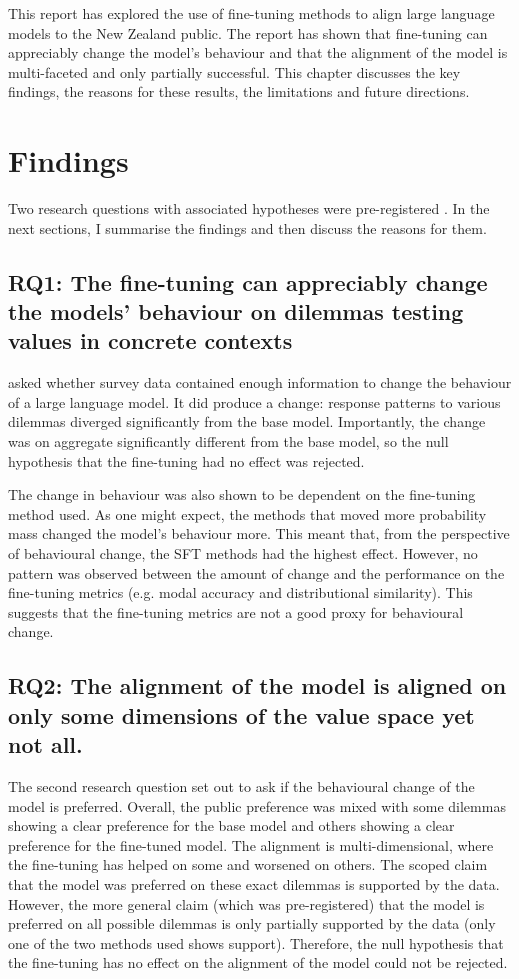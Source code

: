 This report has explored the use of fine-tuning methods to align large language models to the New Zealand public. The report has shown that fine-tuning can appreciably change the model's behaviour and that the alignment of the model is multi-faceted and only partially successful. This chapter discusses the key findings, the reasons for these results, the limitations and future directions.

\section{Findings}

Two research questions with associated hypotheses were pre-registered \cite{thompsonPreregistrationAligningLLMs2026/10/1515:17}. In the next sections, I summarise the findings and then discuss the reasons for them.

\subsection{RQ1: The fine-tuning can appreciably change the models' behaviour on dilemmas testing values in concrete contexts}

 asked whether survey data contained enough information to change the behaviour of a large language model. It did produce a change: response patterns to various dilemmas diverged significantly from the base model. Importantly, the change was on aggregate significantly different from the base model, so the null hypothesis that the fine-tuning had no effect was rejected.

The change in behaviour was also shown to be dependent on the fine-tuning method used. As one might expect, the methods that moved more probability mass changed the model's behaviour more. This meant that, from the perspective of behavioural change, the SFT methods had the highest effect. However, no pattern was observed between the amount of change and the performance on the fine-tuning metrics (e.g. modal accuracy and distributional similarity). This suggests that the fine-tuning metrics are not a good proxy for behavioural change.

\subsection{RQ2: The alignment of the model is aligned on only some dimensions of the value space yet not all.}

The second research question  set out to ask if the behavioural change of the model is preferred. Overall, the public preference was mixed with some dilemmas showing a clear preference for the base model and others showing a clear preference for the fine-tuned model. The alignment is multi-dimensional, where the fine-tuning has helped on some and worsened on others. The scoped claim that the model was preferred on these exact dilemmas is supported by the data. However, the more general claim (which was pre-registered) that the model is preferred on all possible dilemmas is only partially supported by the data (only one of the two methods used shows support). Therefore, the null hypothesis that the fine-tuning has no effect on the alignment of the model could not be rejected.

